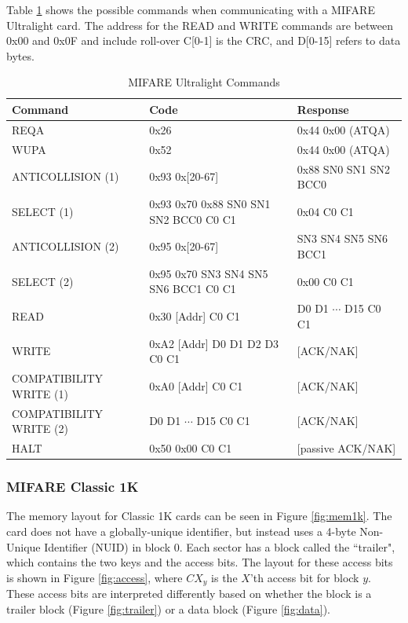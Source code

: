 \documentclass[fleqn,10pt]{SelfArx} %
\begin{document}
\noindent Table \ref{tab:cmdul} shows the possible commands when communicating with a MIFARE Ultralight card. The address for the READ and WRITE commands are between 0x00 and 0x0F and include roll-over  C[0-1] is the CRC, and D[0-15] refers to data bytes.

\begin{table}[h]
\centering
\caption{MIFARE Ultralight Commands}
\label{tab:cmdul}
\begin{tabular}{|l|l|l|}
\hline
\rowcolor{headcolor}
{\bf Command} 		&     {\bf Code} 						&    {\bf Response} 		\\ \hline
REQA 				&     0x26      						&    0x44  0x00 (ATQA) 		\\ \hline
WUPA 			&     0x52      						&    0x44  0x00 (ATQA) 		\\ \hline
ANTICOLLISION (1)  	&     0x93 0x[20-67]     					&    0x88 SN0 SN1 SN2 BCC0       	\\ \hline
SELECT (1) 			&     0x93 0x70 0x88 SN0 SN1 SN2 BCC0 C0 C1       	&    0x04 C0 C1			\\ \hline
ANTICOLLISION (2)		&     0x95 0x[20-67]				       	&    SN3 SN4 SN5 SN6 BCC1        	\\ \hline
SELECT (2) 			&     0x95 0x70 SN3 SN4 SN5 SN6 BCC1 C0 C1       	&    0x00 C0 C1			\\ \hline
READ 				&     0x30 [Addr] C0 C1					&    D0 D1 $\cdots$ D15 C0 C1    	\\ \hline
WRITE 			&     0xA2 [Addr] D0 D1 D2 D3 C0 C1       		&   [ACK/NAK]		         	\\ \hline
COMPATIBILITY WRITE (1)&     0xA0 [Addr] C0 C1 					&   [ACK/NAK]			\\ \hline
COMPATIBILITY WRITE (2)&     D0 D1 $\cdots$ D15 C0 C1				&   [ACK/NAK]			\\ \hline
HALT				&     0x50 0x00 C0 C1				       	&   [passive ACK/NAK]             	\\ \hline
\end{tabular}
\end{table}

\newpage
\subsubsection{MIFARE Classic 1K \cite{classic1k}}
\label{app:classic1k}

The memory layout for Classic 1K cards can be seen in Figure \ref{fig:mem1k}. The card does not have a globally-unique identifier, but instead uses a 4-byte Non-Unique Identifier (NUID) in block 0. Each sector has a block called the ``trailer", which contains the two keys and the access bits. The layout for these access bits is shown in Figure \ref{fig:access}, where $CX_y$ is the $X$'th access bit for block $y$. These access bits are interpreted differently based on whether the block is a trailer block (Figure \ref{fig:trailer}) or a data block (Figure \ref{fig:data}).
\end{document}
